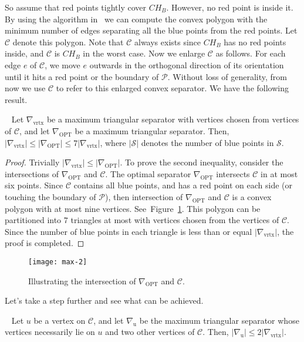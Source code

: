 \documentclass[a4paper,UKenglish]{lipics-v2018}
\theoremstyle{definition}
\begin{document}
So assume that red points  tightly cover $CH_B$. However, no red point is inside it. By using the algorithm in~\cite{conv-sep} we can compute the convex polygon with the minimum number of edges separating  all the blue points from the red points. Let $\mathcal C$ denote this polygon. Note that $\mathcal C$ always exists since $CH_B$ has no red points inside, and $\mathcal C$ is $CH_B$ in the worst case. Now we enlarge $\mathcal C$ as follows. For each edge $e$ of $\mathcal C$, we move $e$ outwards in the orthogonal direction of its orientation until it hits a red point or the boundary of $\mathcal P$. Without loss of generality, from now we use $\mathcal C$ to refer to this enlarged convex separator. We have the following result.

\begin{lemma}~\label{le-1}
Let $\nabla_\mathrm{vrtx}$ be a maximum triangular separator with vertices chosen from vertices of $\mathcal C$, and let $\nabla_{\mathrm{OPT}}$ be a maximum triangular separator. Then, $|\nabla_\mathrm{vrtx}| \leq |\nabla_{\mathrm{OPT}}| \leq 7 |\nabla_\mathrm{vrtx}|$, where $|\mathcal S|$ denotes the number of blue points in $\mathcal S$.
\end{lemma}


\begin{proof}
Trivially $|\nabla_\mathrm{vrtx}| \leq |\nabla_{\mathrm{OPT}}|$.
To prove the second inequality, consider the intersections of $\nabla_{\mathrm{OPT}}$ and $\mathcal C$. The optimal separator  $\nabla_{\mathrm{OPT}}$ intersects $\mathcal C$ in at most six points.
Since $\mathcal C$ contains all blue points, and has a red point on each side (or touching the boundary of $\mathcal P$), then intersection of $\nabla_{\mathrm{OPT}}$ and $\mathcal C$ is a convex polygon with at most nine vertices. See~Figure~\ref{max-2}.
 This polygon can be partitioned into $7$ triangles at most with vertices chosen from the vertices of $\mathcal C$. Since the number of blue points in each triangle is less than or equal $|\nabla_\mathrm{vrtx}|$, the proof is completed.
\end{proof}

\begin{figure}[h]
\centering
\texttt{[image: max-2]}
\caption{Illustrating the intersection of $\nabla_{\mathrm{OPT}}$ and $\mathcal C$.}
\label{max-2}
\end{figure}

Let's take a step further and see what can be achieved.

\begin{lemma}~\label{le-2}
Let $u$ be a vertex on $\mathcal C$, and let $\nabla_\mathrm{u}$ be the maximum triangular separator whose vertices necessarily lie on $u$ and two other vertices of $\mathcal C$.  Then, $|\nabla_\mathrm{u}| \leq 2 |\nabla_\mathrm{vrtx}|$.
\end{lemma}
\end{document}
